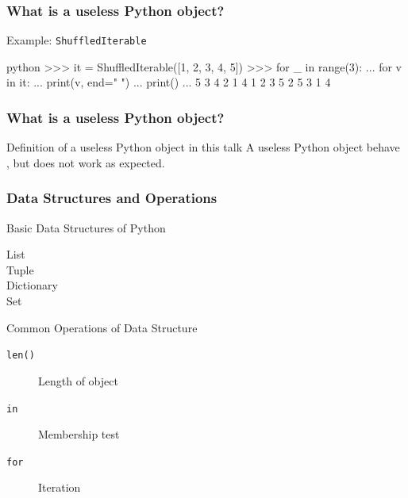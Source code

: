 \documentclass[aspectratio=169,dvipdfmx,12pt,notheorems]{beamer}
\theoremstyle{definition}
\begin{document}
\begin{frame}[fragile]\frametitle{What is a useless Python object?}

\begin{exampleblock}{Example: \texttt{ShuffledIterable}}
\begin{pygments}{python}
>>> it = ShuffledIterable([1, 2, 3, 4, 5])
>>> for _ in range(3):
...     for v in it:
...         print(v, end=" ")
...     print()
...
5 3 4 2 1 
4 1 2 3 5 
2 5 3 1 4
\end{pygments}
\end{exampleblock}

\end{frame}

\begin{frame}\frametitle{What is a useless Python object?}

\begin{block}{Definition of a useless Python object in this talk}
A useless Python object behave , but does not work as expected.
\end{block}

\end{frame}

\begin{frame}[fragile]\frametitle{Data Structures and Operations}

\begin{block}{Basic Data Structures of Python}
\begin{description}
\item[List] \pyv{[1, 4, 9, 16, 25, 36]}
\item[Tuple] 
\item[Dictionary] 
\item[Set] 
\end{description}
\end{block}

\begin{block}{Common Operations of Data Structure}
\begin{description}
\item[\texttt{len()}] Length of object
\item[\texttt{in}] Membership test
\item[\texttt{for}] Iteration
\end{description}
\end{block}

\end{frame}
\end{document}
